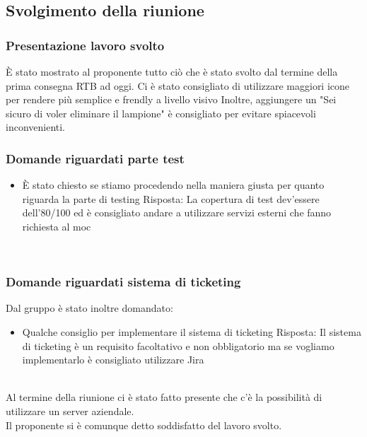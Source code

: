 \documentclass[12pt]{article}
\begin{document}
\subsection{Svolgimento della riunione}
\subsubsection{Presentazione lavoro svolto}
È stato mostrato al proponente tutto ciò che è stato svolto dal termine della prima consegna RTB ad oggi.
Ci è stato consigliato di utilizzare maggiori icone per rendere più semplice e frendly a livello visivo
Inoltre, aggiungere un "Sei sicuro di voler eliminare il lampione" è consigliato per evitare spiacevoli inconvenienti.
\\
\subsubsection{Domande riguardati parte test}
\begin{itemize}
    \item È stato chiesto se stiamo procedendo nella maniera giusta per quanto riguarda la parte di testing
    \subitem Risposta: La copertura di test dev'essere dell'80/100 ed è consigliato andare a utilizzare servizi esterni che fanno richiesta al moc
\end{itemize}
\\
\subsubsection{Domande riguardati sistema di ticketing}
Dal gruppo è stato inoltre domandato: 
\begin{itemize}
    \item Qualche consiglio per implementare il sistema di ticketing
    \subitem Risposta: Il sistema di ticketing è un requisito facoltativo e non obbligatorio ma se vogliamo implementarlo è consigliato utilizzare Jira
\end{itemize}
\\
Al termine della riunione ci è stato fatto presente che c'è la possibilità di utilizzare un server aziendale.
\\
Il proponente si è comunque detto soddisfatto del lavoro svolto. 
\end{document}
